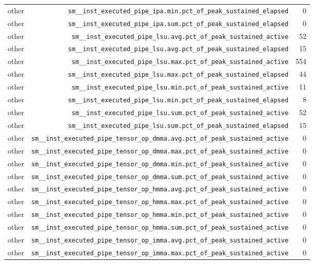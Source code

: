 \begin{table}[h]
\begin{tabular}{|l|r|r|}
other & \texttt{sm__inst_executed_pipe_ipa.min.pct_of_peak_sustained_elapsed} & 0 \\
other & \texttt{sm__inst_executed_pipe_ipa.sum.pct_of_peak_sustained_elapsed} & 0 \\
other & \texttt{sm__inst_executed_pipe_lsu.avg.pct_of_peak_sustained_active} & 52 \\
other & \texttt{sm__inst_executed_pipe_lsu.avg.pct_of_peak_sustained_elapsed} & 15 \\
other & \texttt{sm__inst_executed_pipe_lsu.max.pct_of_peak_sustained_active} & 554 \\
other & \texttt{sm__inst_executed_pipe_lsu.max.pct_of_peak_sustained_elapsed} & 44 \\
other & \texttt{sm__inst_executed_pipe_lsu.min.pct_of_peak_sustained_active} & 11 \\
other & \texttt{sm__inst_executed_pipe_lsu.min.pct_of_peak_sustained_elapsed} & 8 \\
other & \texttt{sm__inst_executed_pipe_lsu.sum.pct_of_peak_sustained_active} & 52 \\
other & \texttt{sm__inst_executed_pipe_lsu.sum.pct_of_peak_sustained_elapsed} & 15 \\
other & \texttt{sm__inst_executed_pipe_tensor_op_dmma.avg.pct_of_peak_sustained_active} & 0 \\
other & \texttt{sm__inst_executed_pipe_tensor_op_dmma.max.pct_of_peak_sustained_active} & 0 \\
other & \texttt{sm__inst_executed_pipe_tensor_op_dmma.min.pct_of_peak_sustained_active} & 0 \\
other & \texttt{sm__inst_executed_pipe_tensor_op_dmma.sum.pct_of_peak_sustained_active} & 0 \\
other & \texttt{sm__inst_executed_pipe_tensor_op_hmma.avg.pct_of_peak_sustained_active} & 0 \\
other & \texttt{sm__inst_executed_pipe_tensor_op_hmma.max.pct_of_peak_sustained_active} & 0 \\
other & \texttt{sm__inst_executed_pipe_tensor_op_hmma.min.pct_of_peak_sustained_active} & 0 \\
other & \texttt{sm__inst_executed_pipe_tensor_op_hmma.sum.pct_of_peak_sustained_active} & 0 \\
other & \texttt{sm__inst_executed_pipe_tensor_op_imma.avg.pct_of_peak_sustained_active} & 0 \\
other & \texttt{sm__inst_executed_pipe_tensor_op_imma.max.pct_of_peak_sustained_active} & 0 \\

\end{tabular}
\end{table}
